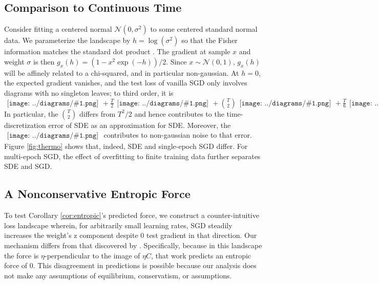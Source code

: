 \documentclass{article}
\theoremstyle{plain}
\theoremstyle{definition}
\newcommand{\Nn}{\mathcal{N}}
\newcommand{\sdia}[1]{\begin{gathered}\texttt{[image: ../diagrams/\#1.png]}\end{gathered}}
\begin{document}
    \subsection{Comparison to Continuous Time}
        Consider fitting a centered normal $\Nn(0, \sigma^2)$ to some centered
        standard normal data.  We parameterize the landscape by
        $h=\log(\sigma^2)$ so that the Fisher information matches the standard
        dot product \citet{am98}.  The gradient at sample $x$ and weight
        $\sigma$ is then $g_x(h) = (1-x^2\exp(-h))/2$.  Since $x\sim \Nn(0,
        1)$, $g_x(h)$ will be affinely related to a chi-squared, and in
        particular non-gaussian.  At $h=0$, the expected gradient vanishes, and
        the test loss of vanilla SGD only involves diagrams with no singleton
        leaves; to third order, it is
        $
            \sdia{(0)()}
            +\frac{T}{2} \sdia{c(01-2)(02-12)}
            +{T\choose 2} \sdia{c(03-1-2)(01-12-23)}
            +\frac{T}{6} \sdia{c(012-3)(03-13-23)}
        $
        In particular, the ${T\choose 2}$ differs from $T^2/2$ and hence
        contributes to the time-discretization error of SDE as an approximation
        for SDE.  Moreover, the $\sdia{c(012-3)(03-13-23)}$ contributes to
        non-gaussian noise to that error.  Figure \ref{fig:thermo} shows that,
        indeed, SDE and single-epoch SGD differ.  For multi-epoch SGD, the
        effect of overfitting to finite training data further separates SDE and
        SGD.


    \subsection{A Nonconservative Entropic Force} \label{subsect:entropic}
        To test Corollary \ref{cor:entropic}'s predicted force, 
        we construct a counter-intuitive loss landscape wherein, for
        arbitrarily small learning rates, SGD steadily increases the weight's
        z component despite 0 test gradient in that direction.
        Our mechanism differs from that discovered by \citet{ch18}.
        Specifically, because in this landscape the force is
        $\eta$-perpendicular to the image of $\eta C$, that work predicts an
        entropic force of $0$.  This disagreement in predictions is possible
        because our analysis does not make any assumptions of equilibrium,
        conservatism, or assumptions.
        
\end{document}
